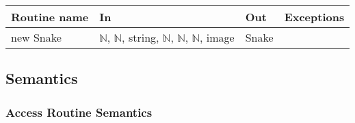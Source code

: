 \documentclass[12pt]{article}
\begin{document}
\begin{tabular}{| l | l | l | l | }
\hline
\textbf{Routine name} & \textbf{In} & \textbf{Out} & \textbf{Exceptions}\\
\hline
new Snake & $\mathbb{N}$, $\mathbb{N}$, string, $\mathbb{N}$, $\mathbb{N}$, $\mathbb{N}$, image & Snake & ~\\
\hline
\end{tabular}

\subsection*{Semantics}




\subsubsection*{Access Routine Semantics}

\end{document}
